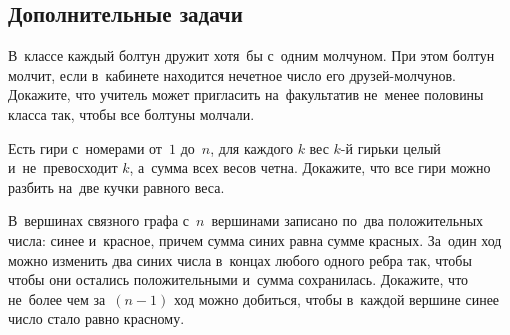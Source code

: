 

\subsection*{Дополнительные задачи}



\begin{problems}

\item
В~классе каждый болтун дружит хотя~бы с~одним молчуном.
При этом болтун молчит, если в~кабинете находится нечетное число его
друзей-молчунов.
Докажите, что учитель может пригласить на~факультатив не~менее половины класса
так, чтобы все болтуны молчали.

\item
Есть гири с~номерами от~$1$ до~$n$, для каждого $k$ вес $k$-й гирьки целый
и~не~превосходит $k$, а~сумма всех весов четна.
Докажите, что все гири можно разбить на~две кучки равного веса.

\item
В~вершинах связного графа с~$n$~вершинами записано по~два положительных числа:
синее и~красное, причем сумма синих равна сумме красных.
За~один ход можно изменить два синих числа в~концах любого одного ребра так,
чтобы чтобы они остались положительными и~сумма сохранилась.
Докажите, что не~более чем за~$(n - 1)$ ход можно добиться, чтобы в~каждой
вершине синее число стало равно красному.

\end{problems}

